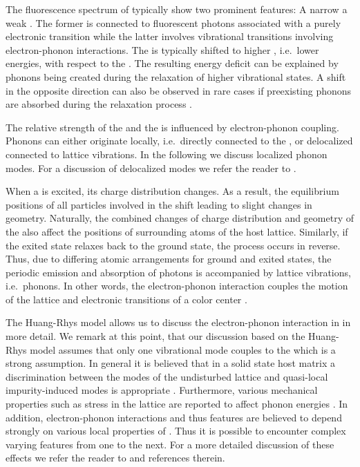     The fluorescence spectrum of \sivs typically show two prominent features: A narrow \zpl a weak \psb. The former is connected to fluorescent photons associated with a purely electronic transition while the latter involves vibrational transitions involving electron-phonon interactions. The \psb is typically shifted to higher \wl, i.e.\ lower energies, with respect to the \zpl. The resulting energy deficit can be explained by phonons being created during the relaxation of higher vibrational states. A shift in the opposite direction can also be observed in rare cases if preexisting phonons are absorbed during the relaxation process \cite{Iakoubovskii2000thesis}.

    The relative strength of the \zpl and the \psb is influenced by electron-phonon coupling. Phonons can either originate locally, i.e.\ directly connected to the \siv, or delocalized connected to lattice vibrations. In the following we discuss localized phonon modes. For a discussion of delocalized modes we refer the reader to \cite{Feng1993b}. 

    When a \cc is excited, its charge distribution changes. As a result, the equilibrium positions of all particles involved in the \cc shift leading to slight changes in \cc geometry. Naturally, the combined changes of charge distribution and geometry of the \cc also affect the positions of surrounding atoms of the host lattice. Similarly, if the exited state relaxes back to the ground state, the process occurs in reverse. Thus, due to differing atomic arrangements for ground and exited states, the periodic emission and absorption of photons is accompanied by lattice vibrations, i.e.\ phonons. In other words, the electron-phonon interaction couples the motion of the lattice and electronic transitions of a color center \cite{Davies1981, Zaitsev2000}.

    The Huang-Rhys model allows us to discuss the electron-phonon interaction in \sivs in more detail.
    We remark at this point, that our discussion based on the Huang-Rhys model assumes that only one vibrational mode couples to the \cc which is a strong assumption. In general it is believed that in a solid state host matrix a discrimination between the modes of the undisturbed lattice and quasi-local impurity-induced modes is appropriate \cite{Zaitsev2000, Feng1993b, Solin1970}. Furthermore, various mechanical properties such as stress in the lattice are reported to affect phonon energies \cite{Grimsditch1978}. In addition, electron-phonon interactions and thus \psb features are believed to depend strongly on various local properties of \ccs \cite{Sternschulte1994, Huttner1995}. Thus it is possible to encounter complex varying \psb features from one \siv to the next. For a more detailed discussion of these effects we refer the reader to \cite{neu2012, Riedrich-moller2014} and references therein.

